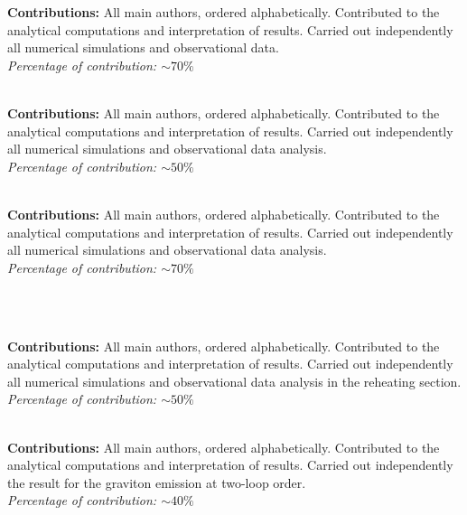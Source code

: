 \documentclass[letterpaper,11pt]{article}
\begin{document}
\begin{enumerate}[label={[\arabic*]}]
\item\indent{}\\
\item\indent{}\\
\textbf{Contributions:} All main authors, ordered alphabetically. Contributed to the analytical computations and interpretation of results. Carried out independently all numerical simulations and observational data.
\\
\textit{Percentage of contribution: $\sim 70\%$}
\item\indent{}\\
\textbf{Contributions:} All main authors, ordered alphabetically. Contributed to the analytical computations and interpretation of results. Carried out independently all numerical simulations and observational data analysis.\\
\textit{Percentage of contribution: $\sim 50\%$}
\item\indent{}\\
\textbf{Contributions:} All main authors, ordered alphabetically. Contributed to the analytical computations and interpretation of results. Carried out independently all numerical simulations and observational data analysis.\\
\textit{Percentage of contribution: $\sim 70\%$}
\item\indent{}\\
\item\indent{}\\
\textbf{Contributions:} All main authors, ordered alphabetically. Contributed to the analytical computations and interpretation of results. Carried out independently all numerical simulations and observational data analysis in the reheating section.
\\
\textit{Percentage of contribution: $\sim 50\%$}
\item\indent{}\\
\textbf{Contributions:} 
All main authors, ordered alphabetically. Contributed to the analytical computations and interpretation of results. Carried out independently the result for the graviton emission at two-loop order.
\\
\textit{Percentage of contribution: $\sim 40\%$}
\end{enumerate}
\end{document}
